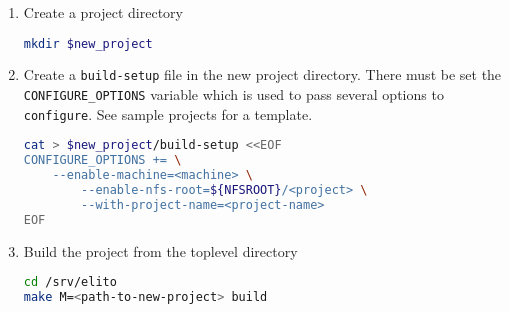 \begin{enumerate}
\item Create a project directory
  \begin{lstlisting}[language=bash]
mkdir $new_project
  \end{lstlisting}%
\item Create a \texttt{build-setup} file in the new project
  directory. There must be set the \texttt{CONFIGURE\_OPTIONS}
  variable which is used to pass several options to
  \texttt{configure}.  See sample projects for a template.
  \begin{lstlisting}[language=bash]
cat > $new_project/build-setup <<EOF
CONFIGURE_OPTIONS += \
	--enable-machine=<machine> \
        --enable-nfs-root=${NFSROOT}/<project> \
        --with-project-name=<project-name>
EOF
  \end{lstlisting}
\item Build the project from the toplevel directory
  \begin{lstlisting}[language=bash]
cd /srv/elito
make M=<path-to-new-project> build
  \end{lstlisting}
\end{enumerate}

